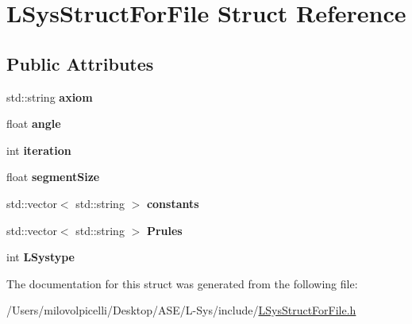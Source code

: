 \hypertarget{struct_l_sys_struct_for_file}{}\section{L\+Sys\+Struct\+For\+File Struct Reference}
\label{struct_l_sys_struct_for_file}
\subsection*{Public Attributes}
\begin{DoxyCompactItemize}
\item 
\mbox{\label{struct_l_sys_struct_for_file_a386e958a00a8cfa8687f282d94b174dd}} 
std\+::string {\bfseries axiom}
\item 
\mbox{\label{struct_l_sys_struct_for_file_a12cbcf0289a17c78c229abade1cfd548}} 
float {\bfseries angle}
\item 
\mbox{\label{struct_l_sys_struct_for_file_a781e98be12590c6141b6a5555dd80da7}} 
int {\bfseries iteration}
\item 
\mbox{\label{struct_l_sys_struct_for_file_ab39a0535cf8c2719a7af16621566bc95}} 
float {\bfseries segment\+Size}
\item 
\mbox{\label{struct_l_sys_struct_for_file_a469e29db26204180f7f84a498fe1b4e1}} 
std\+::vector$<$ std\+::string $>$ {\bfseries constants}
\item 
\mbox{\label{struct_l_sys_struct_for_file_acf5e94941fbd32bea99e541c93d9d1d6}} 
std\+::vector$<$ std\+::string $>$ {\bfseries Prules}
\item 
\mbox{\label{struct_l_sys_struct_for_file_a8e782ff3a754b7effc2b234565270e06}} 
int {\bfseries L\+Systype}
\end{DoxyCompactItemize}


The documentation for this struct was generated from the following file\+:\begin{DoxyCompactItemize}
\item 
/\+Users/milovolpicelli/\+Desktop/\+A\+S\+E/\+L-\/\+Sys/include/\hyperlink{_l_sys_struct_for_file_8h}{L\+Sys\+Struct\+For\+File.\+h}\end{DoxyCompactItemize}
